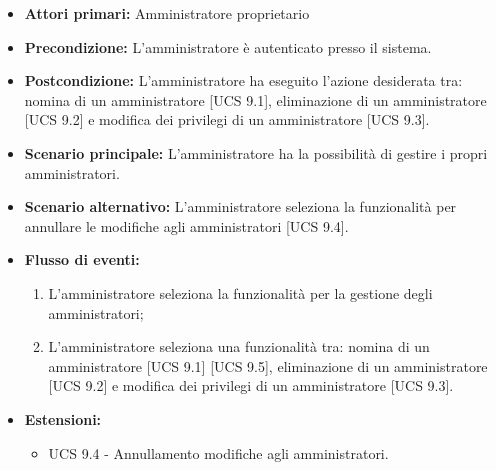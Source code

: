 \begin{itemize}

\item \textbf{Attori primari:} Amministratore proprietario
\item \textbf{Precondizione:} L'amministratore è autenticato presso il sistema.
\item \textbf{Postcondizione:} L'amministratore ha eseguito l'azione desiderata tra: nomina di un amministratore [UCS 9.1], eliminazione di un amministratore [UCS 9.2] e modifica dei privilegi di un amministratore [UCS 9.3].
\item \textbf{Scenario principale:} L'amministratore ha la possibilità di gestire i propri amministratori.
\item \textbf{Scenario alternativo:} L'amministratore seleziona la funzionalità per annullare le modifiche agli amministratori [UCS 9.4].
\item \textbf{Flusso di eventi:} %
  \begin{enumerate}
        \item L'amministratore seleziona la funzionalità per la gestione degli amministratori;
        \item L'amministratore seleziona una funzionalità tra: nomina di un amministratore [UCS 9.1] [UCS 9.5], eliminazione di un amministratore [UCS 9.2] e modifica dei privilegi di un amministratore [UCS 9.3].
    \end{enumerate}
\item \textbf{Estensioni:}
	\begin{itemize}
		\item UCS 9.4 - Annullamento modifiche agli amministratori.
	\end{itemize}
\end{itemize}



